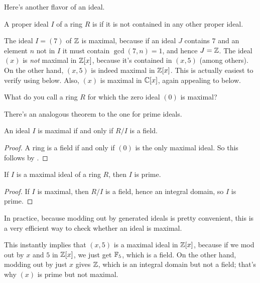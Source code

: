 Here's another flavor of an ideal.
\begin{definition}
	A proper ideal $I$ of a ring $R$ is  if
	it is not contained in any other proper ideal.
\end{definition}

\begin{example}
	\listhack
	\begin{enumerate}[(a)]
		\ii The ideal $I = (7)$ of $\mathbb Z$ is maximal, because
		if an ideal $J$ contains $7$
		and an element $n$ not in $I$
		it must contain $\gcd(7,n) = 1$, and hence $J = \mathbb Z$.
		\ii The ideal $(x)$ is \emph{not} maximal in $\mathbb Z[x]$,
		because it's contained in $(x,5)$ (among others).
		\ii On the other hand, $(x,5)$ is indeed maximal in $\mathbb Z[x]$.
		This is actually easiest to verify using
		 below.
		\ii Also, $(x)$ is maximal in $\mathbb C[x]$,
		again appealing to  below.
	\end{enumerate}
\end{example}

\begin{exercise}
	What do you call a ring $R$ for which the zero ideal $(0)$ is maximal?
\end{exercise}

There's an analogous theorem to the one for prime ideals.
\begin{theorem}
	\label{thm:max_ideal_quotient}
	An ideal $I$ is maximal if and only if $R/I$ is a field.
\end{theorem}
\begin{proof}
	A ring is a field if and only if $(0)$ is the only maximal ideal.
	So this follows by .
\end{proof}

\begin{corollary}
	If $I$ is a maximal ideal of a ring $R$, then $I$ is prime.
\end{corollary}
\begin{proof}
	If $I$ is maximal, then $R/I$ is a field,
	hence an integral domain, so $I$ is prime.
\end{proof}

In practice, because modding out by generated ideals is pretty convenient,
this is a very efficient way to check whether an ideal is maximal.
\begin{example}
	\listhack
	\begin{enumerate}[(a)]
		\ii This instantly implies that $(x,5)$ is a maximal ideal
		in $\mathbb Z[x]$, because if we mod out by $x$ and $5$ in $\mathbb Z[x]$,
		we just get $\mathbb F_5$, which is a field.
		\ii On the other hand, modding out by just $x$ gives $\mathbb Z$,
		which is an integral domain but not a field; that's why $(x)$ is
		prime but not maximal.
	\end{enumerate}
\end{example}

